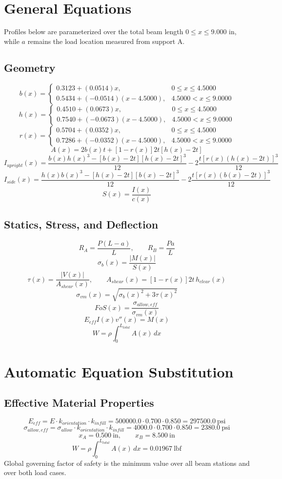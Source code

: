 \documentclass[11pt]{article}
\begin{document}
\section*{General Equations}
Profiles below are parameterized over the total beam length $0 \le x \le 9.000$ in, while $a$ remains the load location measured from support A.
\subsection*{Geometry}
\[
b(x)=\begin{cases}0.3123 + (0.0514)x, & 0 \le x \le 4.5000\\0.5434 + (-0.0514)(x-4.5000), & 4.5000 < x \le 9.0000\end{cases}
\]
\[
h(x)=\begin{cases}0.4510 + (0.0673)x, & 0 \le x \le 4.5000\\0.7540 + (-0.0673)(x-4.5000), & 4.5000 < x \le 9.0000\end{cases}
\]
\[
r(x)=\begin{cases}0.5704 + (0.0352)x, & 0 \le x \le 4.5000\\0.7286 + (-0.0352)(x-4.5000), & 4.5000 < x \le 9.0000\end{cases}
\]
\[
A(x)=2b(x)t+[1-r(x)]2t[h(x)-2t]
\]
\[
I_{upright}(x)=\frac{b(x)h(x)^3-[b(x)-2t][h(x)-2t]^3}{12}-2\frac{t[r(x)(h(x)-2t)]^3}{12}
\]
\[
I_{side}(x)=\frac{h(x)b(x)^3-[h(x)-2t][b(x)-2t]^3}{12}-2\frac{t[r(x)(b(x)-2t)]^3}{12}
\]
\[
S(x)=\frac{I(x)}{c(x)}
\]

\subsection*{Statics, Stress, and Deflection}
\[
R_A=\frac{P(L-a)}{L}, \qquad R_B=\frac{Pa}{L}
\]
\[
\sigma_b(x)=\frac{|M(x)|}{S(x)}
\]
\[
\tau(x)=\frac{|V(x)|}{A_{shear}(x)}, \qquad A_{shear}(x)=[1-r(x)]2t\,h_{clear}(x)
\]
\[
\sigma_{vm}(x)=\sqrt{\sigma_b(x)^2+3\tau(x)^2}
\]
\[
FoS(x)=\frac{\sigma_{allow,eff}}{\sigma_{vm}(x)}
\]
\[
E_{eff}I(x)v''(x)=M(x)
\]
\[
W=\rho\int_0^{L_{total}} A(x)\,dx
\]

\section*{Automatic Equation Substitution}
\subsection*{Effective Material Properties}
\[E_{eff} = E \cdot k_{orientation} \cdot k_{infill} = 500000.0 \cdot 0.700 \cdot 0.850 = 297500.0\ \mathrm{psi}\]
\[\sigma_{allow,eff} = \sigma_{allow} \cdot k_{orientation} \cdot k_{infill} = 4000.0 \cdot 0.700 \cdot 0.850 = 2380.0\ \mathrm{psi}\]
\[x_A = 0.500\ \mathrm{in}, \qquad x_B = 8.500\ \mathrm{in}\]
\[W = \rho \int_0^{L_{total}} A(x)\,dx = 0.01967\ \mathrm{lbf}\]
Global governing factor of safety is the minimum value over all beam stations and over both load cases.
\end{document}
